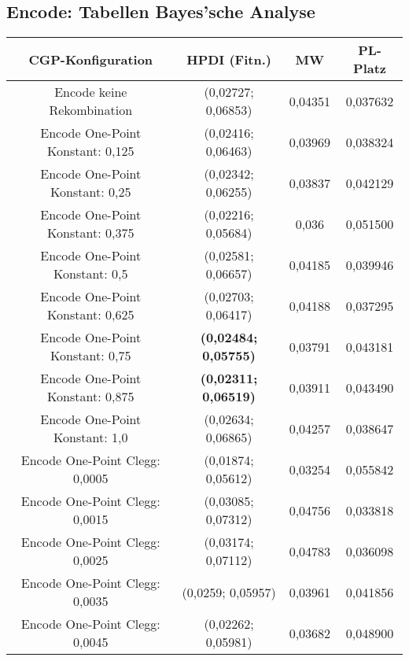\subsection{Encode: Tabellen Bayes'sche Analyse}
\label{subsec:appendixTabellesnBayesEncode}
\begin{table}[H]
	\centering
	\begin{tabular}{c | c | c | c}
		\textbf{CGP-Konfiguration} & \textbf{HPDI (Fitn.)} & \textbf{MW} & \textbf{PL-Platz}\\
		\hline
		Encode keine Rekombination & (0,02727; 0,06853) & \color{red}0,04351\color{black} & 0,037632\\
		\hline
		\hline
		Encode One-Point Konstant: 0,125 & (0,02416; 0,06463) & 0,03969 & 0,038324\\
		\hline
		Encode One-Point Konstant: 0,25 & (0,02342; 0,06255) & 0,03837 & 0,042129\\
		\hline
		Encode One-Point Konstant: 0,375 & (0,02216; 0,05684) & \color{Green}0,036\color{black} & \color{Green}0,051500\color{black}\\
		\hline
		Encode One-Point Konstant: 0,5 & (0,02581; 0,06657) & 0,04185 & 0,039946\\
		\hline
		Encode One-Point Konstant: 0,625 & (0,02703; 0,06417) & 0,04188 & 0,037295\\
		\hline
		Encode One-Point Konstant: 0,75 & \color{Green}\textbf{(0,02484; 0,05755)}\color{black} & 0,03791 & 0,043181\\
		\hline
		Encode One-Point Konstant: 0,875 & \textbf{(0,02311; 0,06519)} & 0,03911 & 0,043490\\
		\hline
		Encode One-Point Konstant: 1,0 & \color{red}(0,02634; 0,06865)\color{black} & 0,04257 & 0,038647\\
		\hline
		\hline
		Encode One-Point Clegg: 0,0005 & (0,01874; 0,05612) & \color{Green}0,03254\color{black} & \color{Green}0,055842\color{black}\\
		\hline
		Encode One-Point Clegg: 0,0015 & \color{red}(0,03085; 0,07312)\color{black} & \color{red}0,04756\color{black} & \color{red}0,033818\color{black}\\
		\hline
		Encode One-Point Clegg: 0,0025 & (0,03174; 0,07112) & \color{red}0,04783\color{black} & \color{red}0,036098\color{black}\\
		\hline
		Encode One-Point Clegg: 0,0035 & (0,0259; 0,05957) & 0,03961 & 0,041856\\
		\hline
		Encode One-Point Clegg: 0,0045 & (0,02262; 0,05981) & 0,03682 & 0,048900\\

\end{tabular}
\end{table}
